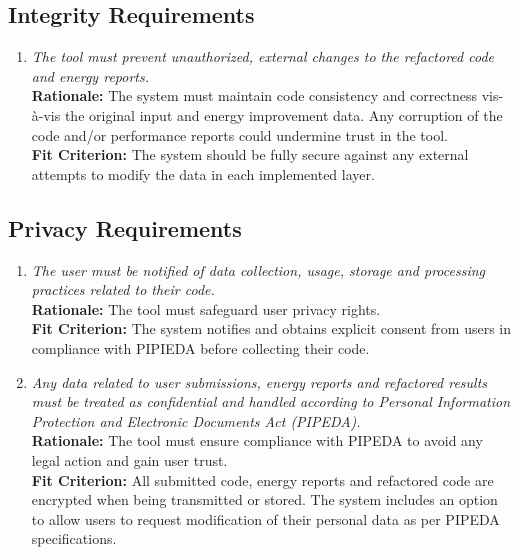 \documentclass[12pt]{article}
\begin{document}
\subsection{Integrity Requirements}
\begin{enumerate}[label=SR-IR \arabic*., wide=0pt, leftmargin=*]
	\item \emph{The tool must prevent unauthorized, external changes to the refactored code and energy reports.}\\[2mm]
    {\bf Rationale:} The system must maintain code consistency and correctness vis-à-vis the original input and energy improvement data. Any corruption of the code and/or performance reports could undermine trust in the tool.\\
    {\bf Fit Criterion:} The system should be fully secure against any external attempts to modify the data in each implemented layer.
\end{enumerate}
\subsection{Privacy Requirements}
\begin{enumerate}[label=SR-PR \arabic*., wide=0pt, leftmargin=*]
	\item \emph{The user must be notified of data collection, usage, storage and processing practices related to their code. }\\[2mm]
    {\bf Rationale:} The tool must safeguard user privacy rights.\\
    {\bf Fit Criterion:} The system notifies and obtains explicit consent from users in compliance with PIPIEDA before collecting their code.
  \item \emph{Any data related to user submissions, energy reports and refactored results must be treated as confidential and handled according to Personal Information Protection and Electronic Documents Act (PIPEDA).}\\
  {\bf Rationale:} The tool must ensure compliance with PIPEDA to avoid any legal action and gain user trust.\\
  {\bf Fit Criterion:} All submitted code, energy reports and refactored code are encrypted when being transmitted or stored. The system includes an option to allow users to request modification of their personal data as per PIPEDA specifications.
\end{enumerate}
\end{document}
